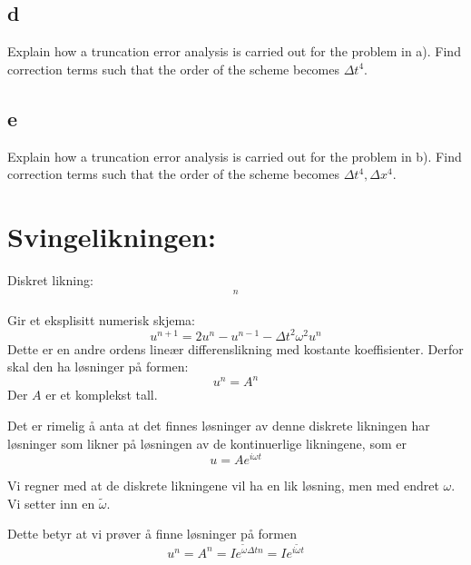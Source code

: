 \documentclass[a4paper, 10pt]{article}
\begin{document}
\subsection{d} 
Explain how a truncation error analysis is carried out for the problem in a). Find correction terms such that the order of the scheme becomes $\Delta t^4$.

\subsection{e} 
Explain how a truncation error analysis is carried out for the problem in b). Find correction terms such that the order of the scheme becomes $\Delta t^4,\Delta x^4$.

\section{Svingelikningen:}
Diskret likning:
\begin{equation}
	[D_t D_t u +\omega^2 u = 0 ]^n
\end{equation}

Gir et eksplisitt numerisk skjema:
\begin{equation}
	u^{n+1} = 2u^n - u^{n-1} - \Delta t^2\omega^2 u^n
\end{equation}
Dette er en andre ordens lineær differenslikning med kostante koeffisienter. Derfor skal den ha løsninger på formen:
\begin{equation}
	u^n = A^n
\end{equation}
Der $A$ er et komplekst tall.

Det er rimelig å anta at det finnes løsninger av denne diskrete likningen har løsninger som likner på løsningen av de kontinuerlige likningene, som er   
\begin{equation}
	u = Ae^{i\omega t}
\end{equation}

Vi regner med at de diskrete likningene vil ha en lik løsning, men med endret $\omega$. Vi setter inn en $\tilde{\omega}$.

Dette betyr at vi prøver å finne løsninger på formen
\begin{equation}
	u^n  =A^n = Ie^{\tilde{\omega}\Delta t n} = I e^{i\tilde{\omega}t}
\end{equation}
\end{document}
